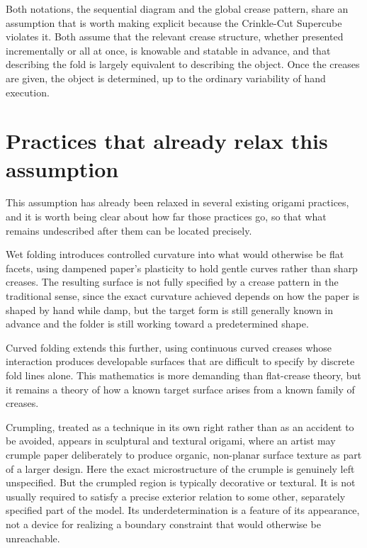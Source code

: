 \documentclass[11pt,oneside]{book}
\begin{document}
Both notations, the sequential diagram and the global crease pattern,
share an assumption that is worth making explicit because the
Crinkle-Cut Supercube violates it. Both assume that the relevant crease
structure, whether presented incrementally or all at once, is knowable
and statable in advance, and that describing the fold is largely
equivalent to describing the object. Once the creases are given, the
object is determined, up to the ordinary variability of hand execution.

\hypertarget{practices-that-already-relax-this-assumption}{%
\section{Practices that already relax this
assumption}\label{practices-that-already-relax-this-assumption}}

This assumption has already been relaxed in several existing origami
practices, and it is worth being clear about how far those practices go,
so that what remains undescribed after them can be located precisely.

Wet folding introduces controlled curvature into what would otherwise be
flat facets, using dampened paper's plasticity to hold gentle curves
rather than sharp creases. The resulting surface is not fully specified
by a crease pattern in the traditional sense, since the exact curvature
achieved depends on how the paper is shaped by hand while damp, but the
target form is still generally known in advance and the folder is still
working toward a predetermined shape.

Curved folding extends this further, using continuous curved creases
whose interaction produces developable surfaces that are difficult to
specify by discrete fold lines alone. This mathematics is more demanding
than flat-crease theory, but it remains a theory of how a known target
surface arises from a known family of creases.

Crumpling, treated as a technique in its own right rather than as an
accident to be avoided, appears in sculptural and textural origami,
where an artist may crumple paper deliberately to produce organic,
non-planar surface texture as part of a larger design. Here the exact
microstructure of the crumple is genuinely left unspecified. But the
crumpled region is typically decorative or textural. It is not usually
required to satisfy a precise exterior relation to some other,
separately specified part of the model. Its underdetermination is a
feature of its appearance, not a device for realizing a boundary
constraint that would otherwise be unreachable.
\end{document}

